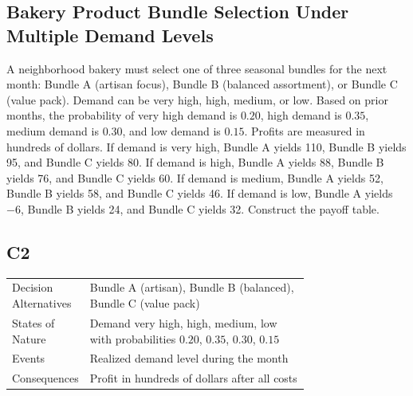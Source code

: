 

	
	\begin{ExamProblems}
		\item
		\subsection*{Bakery Product Bundle Selection Under Multiple Demand Levels}
		A neighborhood bakery must select one of three seasonal bundles for the next month: Bundle A (artisan focus),
		Bundle B (balanced assortment), or Bundle C (value pack). Demand can be very high, high, medium, or low.
		Based on prior months, the probability of very high demand is $0.20$, high demand is $0.35$, medium demand is $0.30$,
		and low demand is $0.15$. Profits are measured in hundreds of dollars. If demand is very high, Bundle A yields 110,
		Bundle B yields 95, and Bundle C yields 80. If demand is high, Bundle A yields 88, Bundle B yields 76, and Bundle C yields 60.
		If demand is medium, Bundle A yields 52, Bundle B yields 58, and Bundle C yields 46. If demand is low, Bundle A yields $-6$,
		Bundle B yields 24, and Bundle C yields 32. Construct the payoff table.
		
		\subsection*{C2}
		\begin{center}
			\begin{tabular}{l p{0.74\linewidth}}
				\toprule
				Decision Alternatives & Bundle A (artisan), Bundle B (balanced), Bundle C (value pack) \\
				States of Nature & Demand very high, high, medium, low with probabilities $0.20$, $0.35$, $0.30$, $0.15$ \\
				Events & Realized demand level during the month \\
				Consequences & Profit in hundreds of dollars after all costs \\
				\bottomrule
			\end{tabular}
		\end{center}
		

\end{ExamProblems}
